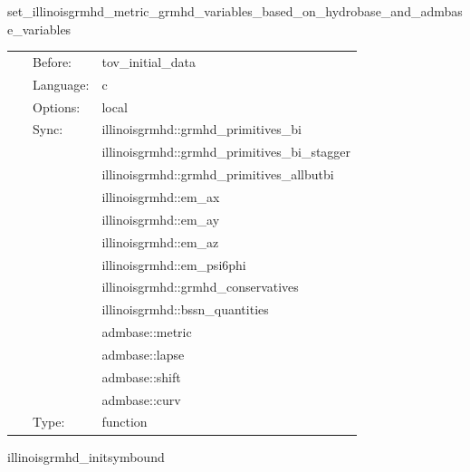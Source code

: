 \documentclass{article}
\begin{document}
\vspace{5mm}


\hspace{5mm} set\_illinoisgrmhd\_metric\_grmhd\_variables\_based\_on\_hydrobase\_and\_admbase\_variables 

\hspace{5mm}{\it convert hydrobase initial data (id) to id that illinoisgrmhd can read. } 


\hspace{5mm}

 \begin{tabular*}{160mm}{cll} 
~ & Before:  & tov\_initial\_data \\ 
~ & Language:  & c \\ 
~ & Options:  & local \\ 
~ & Sync:  & illinoisgrmhd::grmhd\_primitives\_bi \\ 
~& ~ &illinoisgrmhd::grmhd\_primitives\_bi\_stagger\\ 
~& ~ &illinoisgrmhd::grmhd\_primitives\_allbutbi\\ 
~& ~ &illinoisgrmhd::em\_ax\\ 
~& ~ &illinoisgrmhd::em\_ay\\ 
~& ~ &illinoisgrmhd::em\_az\\ 
~& ~ &illinoisgrmhd::em\_psi6phi\\ 
~& ~ &illinoisgrmhd::grmhd\_conservatives\\ 
~& ~ &illinoisgrmhd::bssn\_quantities\\ 
~& ~ &admbase::metric\\ 
~& ~ &admbase::lapse\\ 
~& ~ &admbase::shift\\ 
~& ~ &admbase::curv\\ 
~ & Type:  & function \\ 
\end{tabular*} 


\vspace{5mm}


\hspace{5mm} illinoisgrmhd\_initsymbound 

\hspace{5mm}{\it schedule symmetries -- actually just a placeholder function to ensure prolongation / processor syncs are done before the primitives solver. } 
\end{document}
